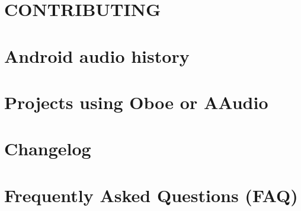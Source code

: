 \let\mypdfximage\pdfximage\def\pdfximage{\immediate\mypdfximage}\documentclass[twoside]{book}
\newcommand{\+}{\discretionary{\mbox{\scriptsize$\hookleftarrow$}}{}{}}
\begin{document}
\chapter{C\+O\+N\+T\+R\+I\+B\+U\+T\+I\+NG}
\label{md__c_1__users_fab_src__github_branches__neural_amp_modeler_plugin_i_plug2__dependencies__build_eac06bd778a225569186ed01a4669f4b}

\chapter{Android audio history}
\label{md__c_1__users_fab_src__github_branches__neural_amp_modeler_plugin_i_plug2__dependencies__build_1ee3f1bbc770182d4de475f1030cd390}

\chapter{Projects using Oboe or A\+Audio}
\label{md__c_1__users_fab_src__github_branches__neural_amp_modeler_plugin_i_plug2__dependencies__build_65442e5a82bbee5ce586e92b6c3f6fe7}

\chapter{Changelog}
\label{md__c_1__users_fab_src__github_branches__neural_amp_modeler_plugin_i_plug2__dependencies__build_2ca6d34dc3222b764a772bba83e99ebd}

\chapter{Frequently Asked Questions (F\+AQ)}
\label{md__c_1__users_fab_src__github_branches__neural_amp_modeler_plugin_i_plug2__dependencies__build_cc9e4b64d36a02aa3d9e8f45196456a9}

\end{document}
